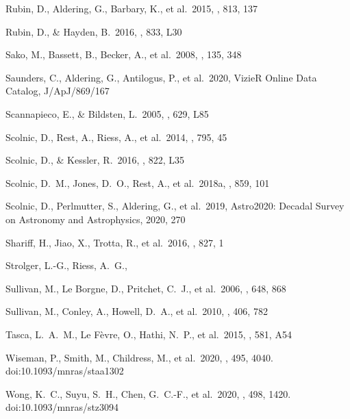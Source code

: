 \documentclass[]{aa}
\begin{document}
\begin{thebibliography}{}
 Rubin, D., Aldering, G., Barbary, K., et
al.\ 2015, \apj, 813, 137

 Rubin, D., \& Hayden, B.\ 2016,
\apjl, 833, L30


 Sako, M., Bassett, B., Becker, A., et al.\
2008, \aj, 135, 348

 Saunders, C., Aldering, G.,
Antilogus, P., et al.\ 2020, VizieR Online Data Catalog, J/ApJ/869/167

 Scannapieco, E., \&
Bildsten, L.\ 2005, \apjl, 629, L85 

 Scolnic, D., Rest, A., Riess, A., et
al.\ 2014, \apj, 795, 45

 Scolnic, D., \& Kessler, R.\
2016, \apjl, 822, L35

 Scolnic, D.~M., Jones, D.~O., Rest,
A., et al.\ 2018a, \apj, 859, 101

 Scolnic, D., Perlmutter, S.,
Aldering, G., et al.\ 2019, Astro2020: Decadal Survey on Astronomy and
Astrophysics, 2020, 270

 Shariff, H., Jiao, X., Trotta, R.,
et al.\ 2016, \apj, 827, 1

 Strolger, L.-G., Riess, A.~G.,

\bibitem[Sullivan et al.(2006)]{sullivan2006} Sullivan, M., Le Borgne, D.,
Pritchet, C.~J., et al.\ 2006, \apj, 648, 868 

 Sullivan, M., Conley, A., Howell,
D.~A., et al.\ 2010, \mnras, 406, 782


 Tasca, L.~A.~M., Le F{\`e}vre, O.,
Hathi, N.~P., et al.\ 2015, \aap, 581, A54


 Wiseman, P., Smith, M., Childress,
M., et al.\ 2020, \mnras, 495, 4040. doi:10.1093/mnras/staa1302

\bibitem[Wong et al.(2020)]{wong2019} Wong, K.~C., Suyu, S.~H., Chen, G.~C.-F.,
et al.\ 2020, \mnras, 498, 1420. doi:10.1093/mnras/stz3094

\end{thebibliography}
\end{document}
